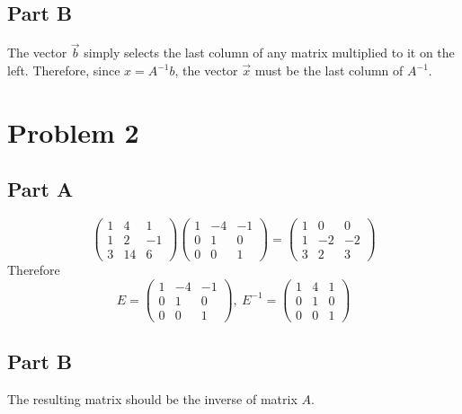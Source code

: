 \documentclass{article}
\begin{document}
\subsection*{Part B}

The vector $ \vec{b} $ simply selects the last column of any matrix multiplied
to it on the left. Therefore, since $ x = A^{-1} b $, the vector $ \vec{x} $
must be the last column of $ A^{-1} $.

\section*{Problem 2}

\subsection*{Part A}

\[
    \begin{pmatrix}
        1 & 4 & 1 \\
        1 & 2 & -1 \\
        3 & 14 & 6
    \end{pmatrix}
    \begin{pmatrix}
        1 & -4 & -1 \\
        0 & 1 & 0 \\
        0 & 0 & 1
    \end{pmatrix}
    =
    \begin{pmatrix}
        1 & 0 & 0 \\
        1 & -2 & -2 \\
        3 & 2 & 3
    \end{pmatrix}
\]
Therefore
\[
    E = \begin{pmatrix}
        1 & -4 & -1 \\
        0 & 1 & 0 \\
        0 & 0 & 1
    \end{pmatrix},\ 
    E^{-1} = \begin{pmatrix}
        1 & 4 & 1 \\
        0 & 1 & 0 \\
        0 & 0 & 1
    \end{pmatrix}
\]

\subsection*{Part B}

The resulting matrix should be the inverse of matrix $ A $.
\end{document}
